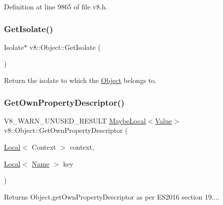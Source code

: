 Definition at line 9865 of file v8.\+h.

\mbox{\label{classv8_1_1Object_ab991b53d50ab3ce53179e927e52b24f5}} 
\subsubsection{\texorpdfstring{Get\+Isolate()}{GetIsolate()}}
{\footnotesize\ttfamily Isolate$\ast$ v8\+::\+Object\+::\+Get\+Isolate (\begin{DoxyParamCaption}{ }\end{DoxyParamCaption})}

Return the isolate to which the \mbox{\hyperlink{classv8_1_1Object}{Object}} belongs to. \mbox{\label{classv8_1_1Object_a96c87fe175a5f66b156bb9fa472e480d}} 
\subsubsection{\texorpdfstring{Get\+Own\+Property\+Descriptor()}{GetOwnPropertyDescriptor()}}
{\footnotesize\ttfamily V8\+\_\+\+W\+A\+R\+N\+\_\+\+U\+N\+U\+S\+E\+D\+\_\+\+R\+E\+S\+U\+LT \mbox{\hyperlink{classv8_1_1MaybeLocal}{Maybe\+Local}}$<$\mbox{\hyperlink{classv8_1_1Value}{Value}}$>$ v8\+::\+Object\+::\+Get\+Own\+Property\+Descriptor (\begin{DoxyParamCaption}\item[{\mbox{\hyperlink{classv8_1_1Local}{Local}}$<$ Context $>$}]{context,  }\item[{\mbox{\hyperlink{classv8_1_1Local}{Local}}$<$ \mbox{\hyperlink{classv8_1_1Name}{Name}} $>$}]{key }\end{DoxyParamCaption})}

Returns Object.\+get\+Own\+Property\+Descriptor as per E\+S2016 section 19.... \mbox{\label{classv8_1_1Object_a345cc5b8e646c89bdf03b76f60544c91}} 
